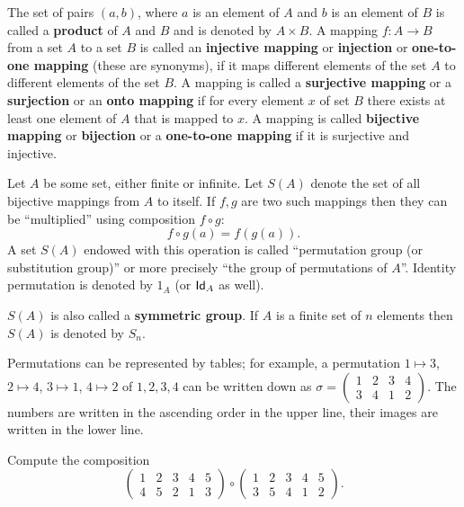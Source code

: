 \documentclass[12pt]{article}
\begin{document}



The set of pairs $(a,b)$, where $a$ is an element of $A$ and $b$ is an
element of $B$ is called a {\bf product} of $A$ and $B$ and is denoted
by $A \times B$.  A mapping $f:A \to B$ from a set $A$ to a set $B$
is called an {\bf injective mapping} or {\bf injection} or {\bf
  one-to-one mapping} (these are synonyms), if it maps different
elements of the set $A$ to different elements of the set $B$. A
mapping is called a {\bf surjective mapping} or a {\bf surjection} or
an {\bf onto mapping} if for every element $x$ of set $B$ there exists
at least one element of $A$ that is mapped to $x$. A mapping is called
{\bf bijective mapping} or {\bf bijection} or a {\bf one-to-one
  mapping} if it is surjective and injective.

Let $A$ be some set, either finite or infinite. Let $S(A)$ denote
the set of all bijective mappings from $A$ to itself. If $f, g$ are
two such mappings then they can be ``multiplied'' using composition
$f\circ g$:
$$
f \circ g (a) = f(g(a)).
$$ A set $S(A)$ endowed with this operation is called ``permutation
group (or substitution group)'' or more precisely ``the group of
permutations of $A$''. Identity permutation is denoted by $1_A$
(or $\operatorname{\sf Id}_A$ as well).

$S(A)$ is also called a {\bf symmetric group}. If $A$ is a finite set
of $n$ elements then $S(A)$ is denoted by $S_n$.

Permutations can be represented by tables; for example, a permutation
$1 \mapsto 3$, $2 \mapsto 4$, $3 \mapsto 1$, $4 \mapsto 2$ of
$1,2,3,4$ can be written down as $\sigma =
\left(\begin{array}{cccc}1&2&3&4\\3&4&1&2\end{array}\right)$. The
numbers are written in the ascending order in the upper line, their
images are written in the lower line.

\begin{zadacha}
  Compute the composition
$$
\left(\begin{array}{ccccc}1&2&3&4&5\\4&5&2&1&3\end{array}\right) \circ 
\left(\begin{array}{ccccc}1&2&3&4&5\\3&5&4&1&2\end{array}\right).
$$
\end{zadacha}
\end{document}

